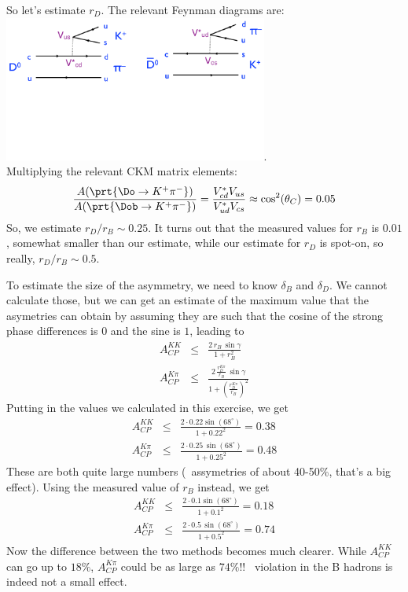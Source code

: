 \begin{enumerate}[a)]
{ So let's estimate $r_D$. The relevant Feynman diagrams are:
 \\\includegraphics[width=0.65\textwidth]{problemsheets/ps2figs/D2KpiDiagrams}.\\
 Multiplying the relevant CKM matrix elements:
    \[
     \frac{A(\prt{\Do \to K^+ \pi^-})}{A(\prt{\Dob\to K^+\pi^-})}
     =
     \frac{V_{cd}^* V_{us}}{ V_{ud}^* V_{cs}}
     \approx \cos^2(\theta_C) = 0.05
    \]
 So, we estimate $r_D/r_B \sim 0.25$. It turns out that the measured values for $r_B$ is $0.01$, somewhat smaller than our estimate, while our estimate for $r_D$ is spot-on, so really, $r_D/r_B \sim 0.5$.
 
 To estimate the size of the asymmetry, we need to know $\delta_B$ and $\delta_D$. We cannot calculate those, but we can get an estimate of the maximum value that the asymetries can obtain by assuming they are such that the cosine of the strong phase differences is $0$ and the sine is $1$, leading to
 \begin{eqnarray*}
     A_{CP}^{KK} 
       & \leq & 
      \frac{
        2\,r_B\,\sin\gamma
      }{
        1 + r_B^2 
      }
  \\ A_{CP}^{K\pi} 
       & \leq & 
      \frac{
        2\,\frac{r_D^{K\pi}}{r_B}\,\sin\gamma
      }{
        1 + \left(\frac{r_D^{K\pi}}{r_B}\right)^2 
      } 
  \end{eqnarray*}
 Putting in the values we calculated in this exercise, we get
  \begin{eqnarray*}
     A_{CP}^{KK} 
       & \leq & 
      \frac{
        2 \cdot 0.22 \sin(68^{\circ})
      }{
        1 + 0.22^2 
      } = 0.38
  \\ A_{CP}^{K\pi} 
       & \leq & 
      \frac{
        2\cdot 0.25\,\sin(68^{\circ})
      }{
        1 + 0.25^2 
      } =0.48
  \end{eqnarray*}
 These are both quite large numbers (\cp\ assymetries of about 40-50\%, that's a big effect). Using the measured value of $r_B$ instead, we get
  \begin{eqnarray*}
     A_{CP}^{KK} 
       & \leq & 
      \frac{
        2 \cdot 0.1 \sin(68^{\circ})
      }{
        1 + 0.1^2 
      } = 0.18
  \\ A_{CP}^{K\pi} 
       & \leq & 
      \frac{
        2\cdot 0.5\,\sin(68^{\circ})
      }{
        1 + 0.5^2 
      } =0.74
  \end{eqnarray*}
 Now the difference between the two methods becomes much clearer. While $A_{CP}^{KK}$ can go up to $18\%$, $A_{CP}^{K\pi}$ could be as large as $74\%$!! \cp\ violation in the B hadrons is indeed not a small effect.
 }
\end{enumerate}




